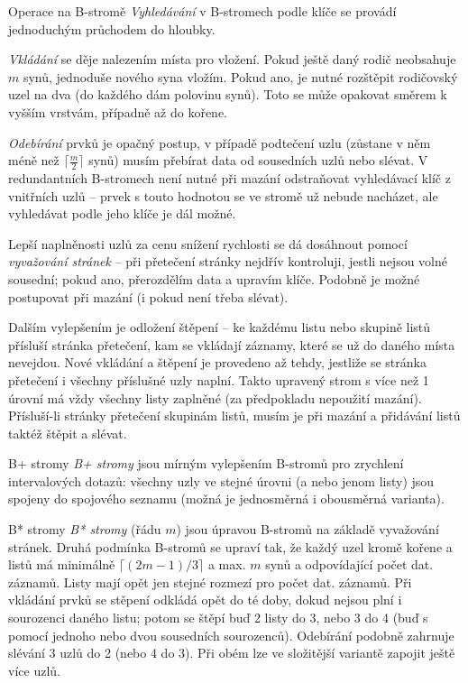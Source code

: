 \begin{algoritmusN}{Operace na B-stromě}
\emph{Vyhledávání} v B-stromech podle klíče se provádí jednoduchým průchodem do hloubky.

\emph{Vkládání} se děje nalezením místa pro vložení. Pokud ještě daný rodič neobsahuje $m$ synů, jednoduše nového syna vložím. Pokud ano, je nutné rozštěpit rodičovský uzel na dva (do každého dám polovinu synů). Toto se může opakovat směrem k vyšším vrstvám, případně až do kořene.

\emph{Odebírání} prvků je opačný postup, v případě podtečení uzlu (zůstane v něm méně než $\lceil\frac{m}{2}\rceil$ synů) musím přebírat data od sousedních uzlů nebo slévat. V redundantních B-stromech není nutné při mazání odstraňovat vyhledávací klíč z vnitřních uzlů -- prvek s touto hodnotou se ve stromě už nebude nacházet, ale vyhledávat podle jeho klíče je dál možné.
\par
Lepší naplněnosti uzlů za cenu snížení rychlosti se dá dosáhnout pomocí \emph{vyvažování stránek} -- při přetečení stránky nejdřív kontroluji, jestli nejsou volné sousední; pokud ano, přerozdělím data a upravím klíče. Podobně je možné postupovat při mazání (i pokud není třeba slévat).
\par
Dalším vylepšením je odložení štěpení -- ke každému listu nebo skupině listů přísluší stránka přetečení, kam se vkládají záznamy, které se už do daného místa nevejdou. Nové vkládání a štěpení je provedeno až tehdy, jestliže se stránka přetečení i všechny příslušné uzly naplní. Takto upravený strom s více než 1 úrovní má vždy všechny listy zaplněné (za předpokladu nepoužití mazání). Přísluší-li stránky přetečení skupinám listů, musím je při mazání a přidávání listů taktéž štěpit a slévat.
\end{algoritmusN}

\begin{definiceN}{B+ stromy}
\emph{B+ stromy} jsou mírným vylepšením B-stromů pro zrychlení intervalových dotazů: všechny uzly ve stejné úrovni (a nebo jenom listy) jsou spojeny do spojového seznamu (možná je jednosměrná i obousměrná varianta).
\end{definiceN}

\begin{definiceN}{B* stromy}
\emph{B* stromy} (řádu $m$) jsou úpravou B-stromů na základě vyvažování stránek. Druhá podmínka B-stromů se upraví tak, že každý uzel kromě kořene a listů má minimálně $\lceil(2m-1)/3\rceil$ a max. $m$ synů a odpovídající počet dat. záznamů. Listy mají opět jen stejné rozmezí pro počet dat. záznamů. Při vkládání prvků se stěpení odkládá opět do té doby, dokud nejsou plní i sourozenci daného listu; potom se štěpí buď 2 listy do 3, nebo 3 do 4 (buď s pomocí jednoho nebo dvou sousedních sourozenců). Odebírání podobně zahrnuje slévání 3 uzlů do 2 (nebo 4 do 3). Při obém lze ve složitější variantě zapojit ještě více uzlů.
\end{definiceN}

